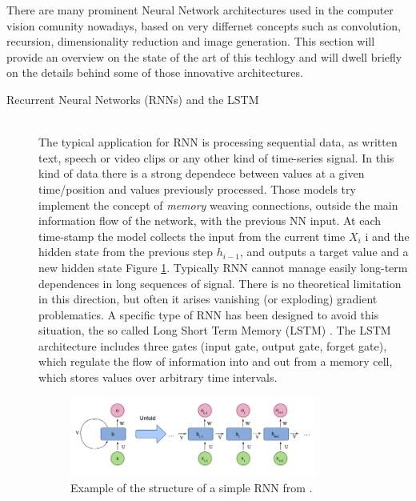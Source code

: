 There are many prominent Neural Network architectures used in the computer vision comunity nowadays, based on very differnet concepts such as convolution, recursion, dimensionality reduction and image generation. This section will provide an overview on the state of the art of this techlogy and will dwell briefly on the details behind some of those innovative architectures.

\begin{description}
    \item [Recurrent Neural Networks (RNNs) and the LSTM] \hfill \\
        The typical application for RNN is processing sequential data, as written text, speech or video clips or any other kind of time-series signal. In this kind of data there is a strong dependece between values at a given time/position and values previously processed. Those models try implement the concept of \textit{memory} weaving connections, outside the main information flow of the network, with the previous NN input. At each time-stamp the model collects the input from the current time $X_i$ i and the hidden state from the previous step $h_{i-1}$, and outputs a target value and a new hidden state Figure \ref{fig:recNN}. Typically RNN cannot manage easily long-term dependences in long sequences of signal. There is no theoretical limitation in this direction, but often it arises vanishing (or exploding) gradient problematics. A specific type of RNN has been designed to avoid this situation, the so called Long Short Term Memory (LSTM) \cite{LSTM}. The LSTM architecture includes three gates (input gate, output gate, forget gate), which regulate the flow of information into and out from a memory cell, which stores values over arbitrary time intervals.

        \begin{figure}
            \centering
            \includegraphics[width = 0.8\textwidth]{images/recNN}
            \caption{Example of the structure of a simple RNN from  \cite{deep_seg_SOA}.}
            \label{fig:recNN}
        \end{figure}


\end{description}
